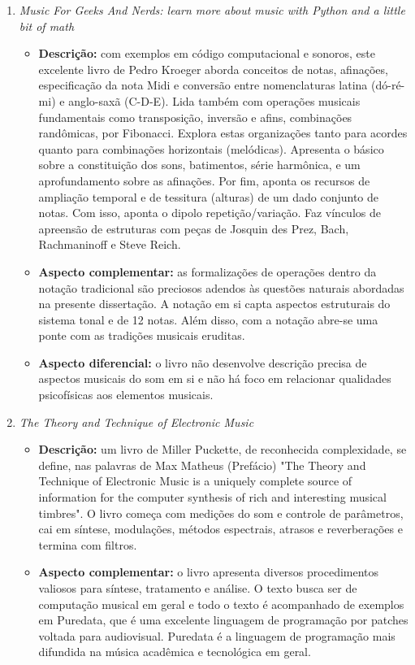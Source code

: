 \begin{enumerate}
    \item \emph{Music For Geeks And Nerds: learn more about music with Python and a little bit of math}
        \begin{itemize}
            \item {\bf Descrição:} com exemplos em código computacional e sonoros, este excelente livro de Pedro Kroeger aborda conceitos de notas, afinações, especificação da nota Midi e conversão entre nomenclaturas latina (dó-ré-mi) e anglo-saxã (C-D-E). Lida também com operações musicais fundamentais como transposição, inversão e afins, combinações randômicas, por Fibonacci. Explora estas organizações tanto para acordes quanto para combinações horizontais (melódicas). Apresenta o básico sobre a constituição dos sons, batimentos, série harmônica, e um aprofundamento sobre as afinações. Por fim, aponta os recursos de ampliação temporal e de tessitura (alturas) de um dado conjunto de notas. Com isso, aponta o dipolo repetição/variação. Faz vínculos de apreensão de estruturas com peças de Josquin des Prez, Bach, Rachmaninoff e Steve Reich.
            \item {\bf Aspecto complementar:} as formalizações de operações dentro da notação tradicional são preciosos adendos às questões naturais abordadas na presente dissertação. A notação em si capta aspectos estruturais do sistema tonal e de 12 notas. Além disso, com a notação abre-se uma ponte com as tradições musicais eruditas.
            \item {\bf Aspecto diferencial:} o livro não desenvolve descrição precisa de aspectos musicais do som em si e não há foco em relacionar qualidades psicofísicas aos elementos musicais.
        \end{itemize}
    \item  \emph{The Theory and Technique of Electronic Music}
        \begin{itemize}
            \item {\bf Descrição:} um livro de Miller Puckette, de reconhecida complexidade, se define, nas palavras de Max Matheus (Prefácio) "The Theory and Technique of Electronic Music is a uniquely complete source of information for the computer synthesis of rich and interesting musical timbres". O livro começa com medições do som e controle de parâmetros, cai em síntese, modulações, métodos espectrais, atrasos e reverberações e termina com filtros.
            \item {\bf Aspecto complementar:} o livro apresenta diversos procedimentos valiosos para síntese, tratamento e análise. O texto busca ser de computação musical em geral e todo o texto é acompanhado de exemplos em Puredata, que é uma excelente linguagem de programação por patches voltada para audiovisual. Puredata é a linguagem de programação mais difundida na música acadêmica e tecnológica em geral.

\end{itemize}
\end{enumerate}
